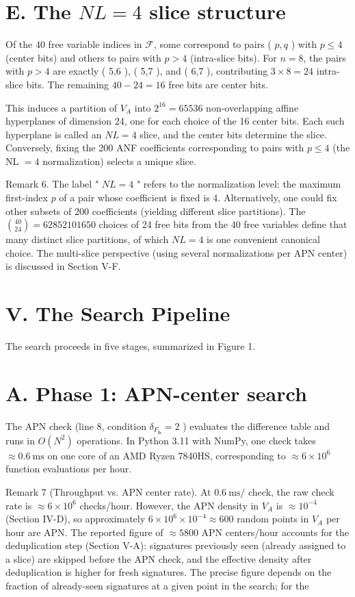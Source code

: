 \documentclass[10pt]{article}
\begin{document}
\section*{E. The $N L=4$ slice structure}
Of the 40 free variable indices in $\mathcal{F}$, some correspond to pairs ( $p, q$ ) with $p \leq 4$ (center bits) and others to pairs with $p>4$ (intra-slice bits). For $n=8$, the pairs with $p>4$ are exactly ( 5,6 ), ( 5,7 ), and ( 6,7 ), contributing $3 \times 8=24$ intra-slice bits. The remaining $40-24=16$ free bits are center bits.

This induces a partition of $V_{A}$ into $2^{16}=65536$ non-overlapping affine hyperplanes of dimension 24, one for each choice of the 16 center bits. Each such hyperplane is called an $N L=4$ slice, and the center bits determine the slice. Conversely, fixing the 200 ANF coefficients corresponding to pairs with $p \leq 4$ (the NL $=4$ normalization) selects a unique slice.

Remark 6. The label " $N L=4$ " refers to the normalization level: the maximum first-index $p$ of a pair whose coefficient is fixed is 4. Alternatively, one could fix other subsets of 200 coefficients (yielding different slice partitions). The $\binom{40}{24}=62852101650$ choices of 24 free bits from the 40 free variables define that many distinct slice partitions, of which $N L=4$ is one convenient canonical choice. The multi-slice perspective (using several normalizations per APN center) is discussed in Section V-F.

\section*{V. The Search Pipeline}
The search proceeds in five stages, summarized in Figure 1.

\section*{A. Phase 1: APN-center search}
The APN check (line 8, condition $\delta_{F_{\mathbf{b}}}=2$ ) evaluates the difference table and runs in $O\left(N^{2}\right)$ operations. In Python 3.11 with NumPy, one check takes $\approx 0.6 \mathrm{~ms}$ on one core of an AMD Ryzen 7840HS, corresponding to $\approx 6 \times 10^{6}$ function evaluations per hour.

Remark 7 (Throughput vs. APN center rate). At $0.6 \mathrm{~ms} /$ check, the raw check rate is $\approx 6 \times 10^{6}$ checks/hour. However, the APN density in $V_{A}$ is $\approx 10^{-4}$ (Section IV-D), so approximately $6 \times 10^{6} \times 10^{-4} \approx 600$ random points in $V_{A}$ per hour are APN. The reported figure of $\approx 5800$ APN centers/hour accounts for the deduplication step (Section V-A): signatures previously seen (already assigned to a slice) are skipped before the APN check, and the effective density after deduplication is higher for fresh signatures. The precise figure depends on the fraction of already-seen signatures at a given point in the search; for the
\end{document}
